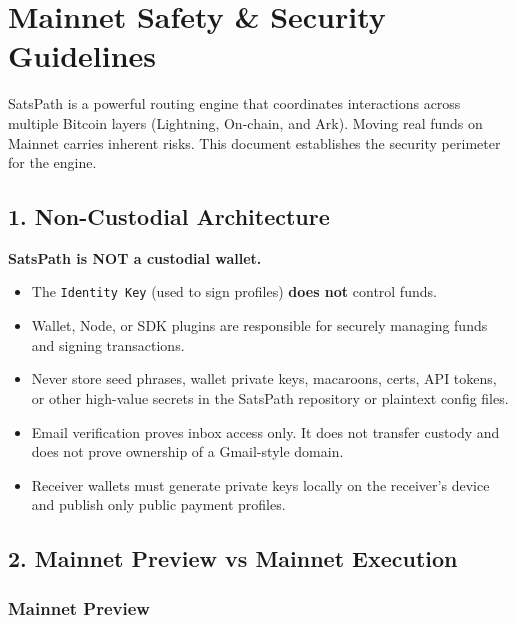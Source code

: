 \documentclass[
]{article}
\author{}
\date{}
\providecommand{\tightlist}{%
  \setlength{\itemsep}{0pt}\setlength{\parskip}{0pt}}
\begin{document}
\hypertarget{mainnet-safety-security-guidelines}{%
\section{Mainnet Safety \& Security
Guidelines}\label{mainnet-safety-security-guidelines}}

SatsPath is a powerful routing engine that coordinates interactions
across multiple Bitcoin layers (Lightning, On-chain, and Ark). Moving
real funds on Mainnet carries inherent risks. This document establishes
the security perimeter for the engine.

\hypertarget{non-custodial-architecture}{%
\subsection{1. Non-Custodial
Architecture}\label{non-custodial-architecture}}

\textbf{SatsPath is NOT a custodial wallet.}

\begin{itemize}
\tightlist
\item
  The \texttt{Identity\ Key} (used to sign profiles) \textbf{does not}
  control funds.
\item
  Wallet, Node, or SDK plugins are responsible for securely managing
  funds and signing transactions.
\item
  Never store seed phrases, wallet private keys, macaroons, certs, API
  tokens, or other high-value secrets in the SatsPath repository or
  plaintext config files.
\item
  Email verification proves inbox access only. It does not transfer
  custody and does not prove ownership of a Gmail-style domain.
\item
  Receiver wallets must generate private keys locally on the receiver's
  device and publish only public payment profiles.
\end{itemize}

\hypertarget{mainnet-preview-vs-mainnet-execution}{%
\subsection{2. Mainnet Preview vs Mainnet
Execution}\label{mainnet-preview-vs-mainnet-execution}}

\hypertarget{mainnet-preview}{%
\subsubsection{Mainnet Preview}\label{mainnet-preview}}
\end{document}
